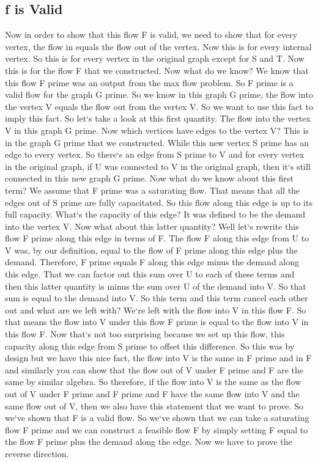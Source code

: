 \subsection{f is Valid}
Now in order to show that this flow F is valid, we need to show that for every vertex, the flow in equals the flow out of the vertex.
Now this is for every internal vertex.
So this is for every vertex in the original graph except for S and T\@.
Now this is for the flow F that we constructed.
Now what do we know? We know that this flow F prime was an output from the max flow problem.
So F prime is a valid flow for the graph G prime.
So we know in this graph G prime, the flow into the vertex V equals the flow out from the vertex V\@.
So we want to use this fact to imply this fact.
So let`s take a look at this first quantity.
The flow into the vertex V in this graph G prime.
Now which vertices have edges to the vertex V? This is in the graph G prime that we constructed.
While this new vertex S prime has an edge to every vertex.
So there`s an edge from S prime to V and for every vertex in the original graph, if U was connected to V in the original graph, then it`s still connected in this new graph G prime.
Now what do we know about this first term? We assume that F prime was a saturating flow.
That means that all the edges out of S prime are fully capacitated.
So this flow along this edge is up to its full capacity.
What`s the capacity of this edge? It was defined to be the demand into the vertex V\@.
Now what about this latter quantity? Well let`s rewrite this flow F prime along this edge in terms of F\@.
The flow F along this edge from U to V was, by our definition, equal to the flow of F prime along this edge plus the demand.
Therefore, F prime equals F along this edge minus the demand along this edge.
That we can factor out this sum over U to each of these terms and then this latter quantity is minus the sum over U of the demand into V\@.
So that sum is equal to the demand into V\@.
So this term and this term cancel each other out and what are we left with? We`re left with the flow into V in this flow F\@.
So that means the flow into V under this flow F prime is equal to the flow into V in this flow F\@.
Now that`s not too surprising because we set up this flow, this capacity along this edge from S prime to offset this difference.
So this was by design but we have this nice fact, the flow into V is the same in F prime and in F and similarly you can show that the flow out of V under F prime and F are the same by similar algebra.
So therefore, if the flow into V is the same as the flow out of V under F prime and F prime and F have the same flow into V and the same flow out of V, then we also have this statement that we want to prove.
So we`ve shown that F is a valid flow.
So we`ve shown that we can take a saturating flow F prime and we can construct a feasible flow F by simply setting F equal to the flow F prime plus the demand along the edge.
Now we have to prove the reverse direction.

